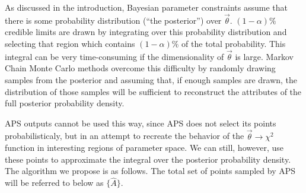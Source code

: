 \documentclass[useAMS,usenatbib]{aastex}
\begin{document}
As discussed in the introduction, Bayesian parameter constraints assume that there is some
probability distribution (``the posterior'') over $\vec{\theta}$.  
$(1-\alpha)\%$ credible limits are drawn by
integrating over this probability distribution and selecting that region which contains
$(1-\alpha)\%$ of the total probability.  This integral can be very time-consuming if the
dimensionality of $\vec{\theta}$ is large.  Markov Chain Monte Carlo methods overcome this
difficulty by randomly drawing samples from the posterior and assuming that, if enough samples
are drawn, the distribution of those samples will be sufficient to reconstruct the attributes
of the full posterior probability density.

APS outputs cannot be used this way, since APS does not select its points
probabilisticaly, but in an attempt to recreate the behavior of the 
$\vec{\theta}\rightarrow\chi^2$ function in
interesting regions of parameter space.  We can still, however, use these points to approximate
the integral over the posterior probability density.  The algorithm we propose is as follows.
The total set of points sampled by APS will be referred to below as $\{\hat{A}\}$.
\end{document}
